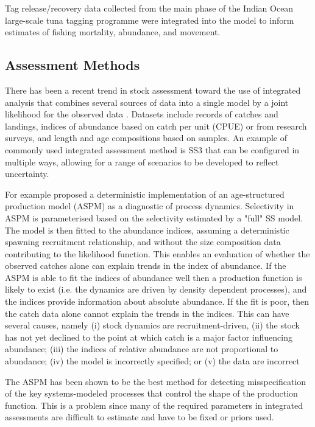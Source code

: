 \documentclass[12pt,halfline,a4paper,nonumbib]{ouparticle}
\begin{document}
Tag release/recovery data collected from the main phase of the Indian Ocean large-scale tuna tagging programme %
were integrated into the model to inform estimates of fishing mortality, abundance, and movement. 


\subsection{Assessment Methods}

There has been a recent trend in stock assessment toward the use of integrated analysis that combines several sources of data into a single model by a joint likelihood for the observed data \parencite[e.g.][]{doubleday1976least,fournier1982general,maunder2013review}. Datasets include records of catches and landings, indices of abundance based on catch per unit (CPUE) or from research surveys, and length and age compositions based on samples. An example of commonly used integrated assessment method is SS3 that can be configured in multiple ways, allowing for a range of scenarios to be developed to reflect uncertainty.

For example \cite{maunder2015contemporary} proposed a deterministic implementation of an age-structured production model (ASPM) as a diagnostic of process dynamics. Selectivity in ASPM is parameterised based on the selectivity estimated by a "full" SS model. The model is then fitted to the abundance indices, assuming a deterministic spawning recruitment relationship, and without the size composition data contributing to the likelihood function. This enables an evaluation of whether the observed catches alone can explain trends in the index of abundance. If the ASPM is able to fit the indices of abundance well then a production function is likely to exist (i.e. the dynamics are driven by density dependent processes), and the indices provide information about absolute abundance. If  the fit is poor, then the catch data alone cannot explain the trends in the indices. This can have several causes, namely (i) stock dynamics are recruitment-driven, (ii) the stock has not yet declined to the point at which catch is a major factor influencing abundance; (iii) the indices of relative abundance are not proportional to abundance;  (iv) the model is incorrectly specified; or (v) the data are incorrect

The ASPM has been shown \parencite{carvalho2017can} to be the best method for detecting misspecification of the key systems-modeled processes that control the shape of the production function. This is a problem since many of the required parameters in integrated assessments are difficult to estimate \parencite[e.g.][]{lee2011m,lee2012steepness} and have to be fixed or priors used. 
\end{document}
